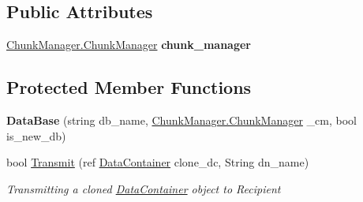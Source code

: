 \subsection*{Public Attributes}
\begin{DoxyCompactItemize}
\item 
\hypertarget{class_dwarf_d_b_1_1_data_structures_1_1_data_base_a8ccf11a71c383f6f1ac6870022a261c3}{\hyperlink{class_dwarf_d_b_1_1_chunk_manager_1_1_chunk_manager}{Chunk\+Manager.\+Chunk\+Manager} {\bfseries chunk\+\_\+manager}}\label{class_dwarf_d_b_1_1_data_structures_1_1_data_base_a8ccf11a71c383f6f1ac6870022a261c3}

\end{DoxyCompactItemize}
\subsection*{Protected Member Functions}
\begin{DoxyCompactItemize}
\item 
\hypertarget{class_dwarf_d_b_1_1_data_structures_1_1_data_base_ab2fe1cc1e8d59bbc68ad1f996507c4ee}{{\bfseries Data\+Base} (string db\+\_\+name, \hyperlink{class_dwarf_d_b_1_1_chunk_manager_1_1_chunk_manager}{Chunk\+Manager.\+Chunk\+Manager} \+\_\+cm, bool is\+\_\+new\+\_\+db)}\label{class_dwarf_d_b_1_1_data_structures_1_1_data_base_ab2fe1cc1e8d59bbc68ad1f996507c4ee}

\item 
bool \hyperlink{class_dwarf_d_b_1_1_data_structures_1_1_data_base_a5eefaebdb94adf4d3b19f29e8f146725}{Transmit} (ref \hyperlink{class_dwarf_d_b_1_1_data_structures_1_1_data_container}{Data\+Container} clone\+\_\+dc, String dn\+\_\+name)
\begin{DoxyCompactList}\small\item\em Transmitting a cloned \hyperlink{class_dwarf_d_b_1_1_data_structures_1_1_data_container}{Data\+Container} object to Recipient \end{DoxyCompactList}\end{DoxyCompactItemize}
